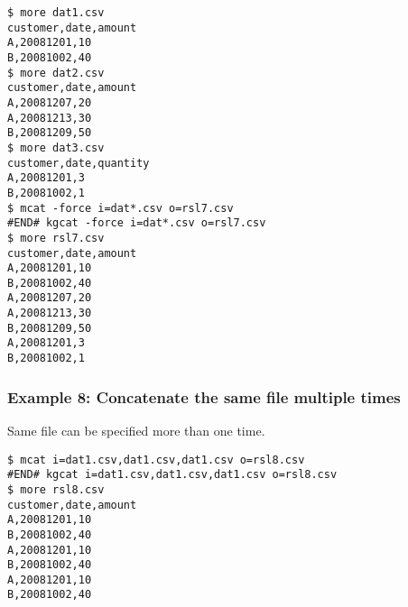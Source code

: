 \begin{Verbatim}[baselinestretch=0.7,frame=single]
$ more dat1.csv
customer,date,amount
A,20081201,10
B,20081002,40
$ more dat2.csv
customer,date,amount
A,20081207,20
A,20081213,30
B,20081209,50
$ more dat3.csv
customer,date,quantity
A,20081201,3
B,20081002,1
$ mcat -force i=dat*.csv o=rsl7.csv
#END# kgcat -force i=dat*.csv o=rsl7.csv
$ more rsl7.csv
customer,date,amount
A,20081201,10
B,20081002,40
A,20081207,20
A,20081213,30
B,20081209,50
A,20081201,3
B,20081002,1
\end{Verbatim}
\subsubsection*{Example 8: Concatenate the same file multiple times}

Same file can be specified more than one time.


\begin{Verbatim}[baselinestretch=0.7,frame=single]
$ mcat i=dat1.csv,dat1.csv,dat1.csv o=rsl8.csv
#END# kgcat i=dat1.csv,dat1.csv,dat1.csv o=rsl8.csv
$ more rsl8.csv
customer,date,amount
A,20081201,10
B,20081002,40
A,20081201,10
B,20081002,40
A,20081201,10
B,20081002,40
\end{Verbatim}
